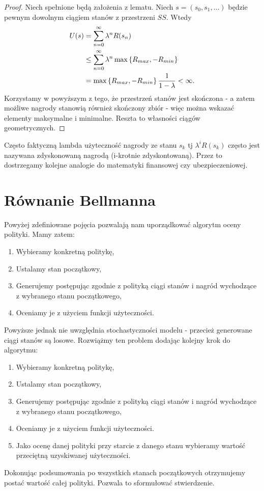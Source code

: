 \documentclass[10pt,a4paper]{book}
\begin{document}
\begin{proof}
Niech spełnione będą założenia z lematu. Niech $s = (s_0, s_1, \ldots)$ będzie pewnym dowolnym ciągiem stanów z przestrzeni $SS$. Wtedy
\begin{align*}
U(s) & = \sum_{n=0}^{\infty} \lambda^n R(s_n) \\
& \leq \sum_{n=0}^{\infty} \lambda^n \max \set{R_{max}, -R_{min}} \\
& = \max \set{R_{max}, -R_{min}} \frac{1}{1-\lambda} < \infty.
\end{align*}
Korzystamy w powyższym z tego, że przestrzeń stanów jest skończona - a zatem możliwe nagrody stanowią również skończony zbiór - więc można wskazać elementy maksymalne i minimalne. Reszta to własności ciągów geometrycznych.
\end{proof}

\begin{remark*}
Często faktyczną lambda użyteczność nagrody ze stanu $s_k$ tj $\lambda^i R(s_k)$ często jest nazywana zdyskonowaną nagrodą (i-krotnie zdyskontowaną). Przez to dostrzegamy kolejne analogie do matematyki finansowej czy ubezpieczeniowej.
\end{remark*}


\section{Równanie Bellmanna}

Powyżej zdefiniowane pojęcia pozwalają nam uporządkować algorytm oceny polityki. Mamy zatem:

\begin{enumerate}
\item Wybieramy konkretną politykę,
\item Ustalamy stan początkowy,
\item Generujemy postępując zgodnie z polityką ciągi stanów i nagród wychodzące z wybranego stanu początkowego,
\item Oceniamy je z użyciem funkcji użyteczności.
\end{enumerate}

Powyższe jednak nie uwzględnia stochastyczności modelu - przecież generowane ciągi stanów są losowe. Rozwiążmy ten problem dodając kolejny krok do algorytmu:

\begin{enumerate}
\item Wybieramy konkretną politykę,
\item Ustalamy stan początkowy,
\item Generujemy postępując zgodnie z polityką ciągi stanów i nagród wychodzące z wybranego stanu początkowego,
\item Oceniamy je z użyciem funkcji użyteczności.
\item Jako ocenę danej polityki przy starcie z danego stanu wybieramy wartość przeciętną uzyskiwanej użyteczności.
\end{enumerate}
Dokonując podsumowania po wszystkich stanach początkowych otrzymujemy postać wartość całej polityki. Pozwala to sformułować stwierdzenie.
\end{document}

